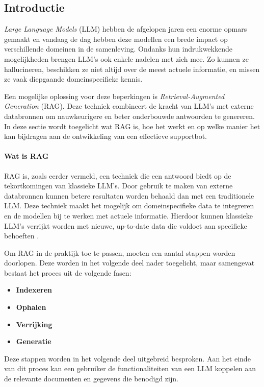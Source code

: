     \subsection{Introductie}   
    \textit{Large Language Models} (LLM) hebben de afgelopen jaren een enorme opmars gemaakt en vandaag de dag hebben deze modellen een brede impact op verschillende domeinen in de samenleving. Ondanks hun indrukwekkende mogelijkheden brengen LLM’s ook enkele nadelen met zich mee. Zo kunnen ze hallucineren, beschikken ze niet altijd over de meest actuele informatie, en missen ze vaak diepgaande domeinspecifieke kennis.  
    
    Een mogelijke oplossing voor deze beperkingen is \textit{Retrieval-Augmented Generation} (RAG). Deze techniek combineert de kracht van LLM’s met externe databronnen om nauwkeurigere en beter onderbouwde antwoorden te genereren. In deze sectie wordt toegelicht wat RAG is, hoe het werkt en op welke manier het kan bijdragen aan de ontwikkeling van een effectieve supportbot.
    
    \paragraph{Wat is RAG}
    RAG is, zoals eerder vermeld, een techniek die een antwoord biedt op de tekortkomingen van klassieke LLM’s. Door gebruik te maken van externe databronnen kunnen betere resultaten worden behaald dan met een traditionele LLM. Deze techniek maakt het mogelijk om domeinspecifieke data te integreren en de modellen bij te werken met actuele informatie. Hierdoor kunnen klassieke LLM’s verrijkt worden met nieuwe, up-to-date data die voldoet aan specifieke behoeften \textcite{Wu2024}.
    
    Om RAG in de praktijk toe te passen, moeten een aantal stappen worden doorlopen. Deze worden in het volgende deel nader toegelicht, maar samengevat bestaat het proces uit de volgende fasen:
    
    \begin{itemize}
        \item \textbf{Indexeren}
        \item \textbf{Ophalen}
        \item \textbf{Verrijking}
        \item \textbf{Generatie}
    \end{itemize}
    
    Deze stappen worden in het volgende deel uitgebreid besproken. Aan het einde van dit proces kan een gebruiker de functionaliteiten van een LLM koppelen aan de relevante documenten en gegevens die benodigd zijn.
    
